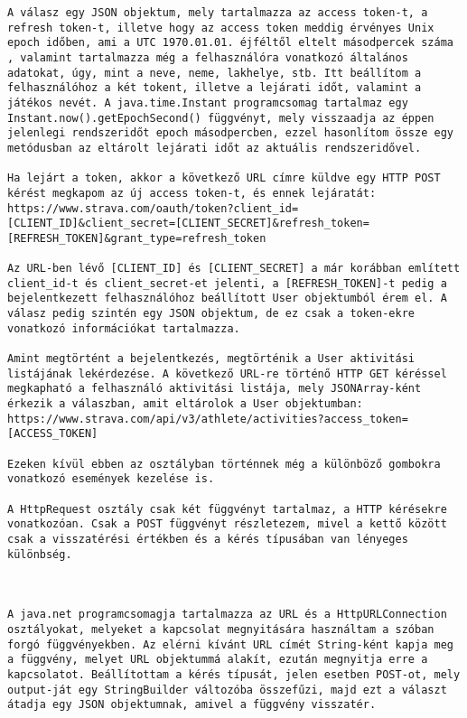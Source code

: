 \begin{verbatim}
A válasz egy JSON objektum, mely tartalmazza az access token-t, a refresh token-t, illetve hogy az access token meddig érvényes Unix epoch időben, ami a UTC 1970.01.01. éjféltől eltelt másodpercek száma , valamint tartalmazza még a felhasználóra vonatkozó általános adatokat, úgy, mint a neve, neme, lakhelye, stb. Itt beállítom a felhasználóhoz a két tokent, illetve a lejárati időt, valamint a játékos nevét. A java.time.Instant programcsomag tartalmaz egy Instant.now().getEpochSecond() függvényt, mely visszaadja az éppen jelenlegi rendszeridőt epoch másodpercben, ezzel hasonlítom össze egy metódusban az eltárolt lejárati időt az aktuális rendszeridővel. 

Ha lejárt a token, akkor a következő URL címre küldve egy HTTP POST kérést megkapom az új access token-t, és ennek lejáratát: https://www.strava.com/oauth/token?client_id=[CLIENT_ID]&client_secret=[CLIENT_SECRET]&refresh_token=[REFRESH_TOKEN]&grant_type=refresh_token 

Az URL-ben lévő [CLIENT_ID] és [CLIENT_SECRET] a már korábban említett client_id-t és client_secret-et jelenti, a [REFRESH_TOKEN]-t pedig a bejelentkezett felhasználóhoz beállított User objektumból érem el. A válasz pedig szintén egy JSON objektum, de ez csak a token-ekre vonatkozó információkat tartalmazza. 

Amint megtörtént a bejelentkezés, megtörténik a User aktivitási listájának lekérdezése. A következő URL-re történő HTTP GET kéréssel megkapható a felhasználó aktivitási listája, mely JSONArray-ként érkezik a válaszban, amit eltárolok a User objektumban: https://www.strava.com/api/v3/athlete/activities?access_token=[ACCESS_TOKEN] 

Ezeken kívül ebben az osztályban történnek még a különböző gombokra vonatkozó események kezelése is. 

A HttpRequest osztály csak két függvényt tartalmaz, a HTTP kérésekre vonatkozóan. Csak a POST függvényt részletezem, mivel a kettő között csak a visszatérési értékben és a kérés típusában van lényeges különbség. 

 

A java.net programcsomagja tartalmazza az URL és a HttpURLConnection osztályokat, melyeket a kapcsolat megnyitására használtam a szóban forgó függvényekben. Az elérni kívánt URL címét String-ként kapja meg a függvény, melyet URL objektummá alakít, ezután megnyitja erre a kapcsolatot. Beállítottam a kérés típusát, jelen esetben POST-ot, mely output-ját egy StringBuilder változóba összefűzi, majd ezt a választ átadja egy JSON objektumnak, amivel a függvény visszatér. 


\end{verbatim}

